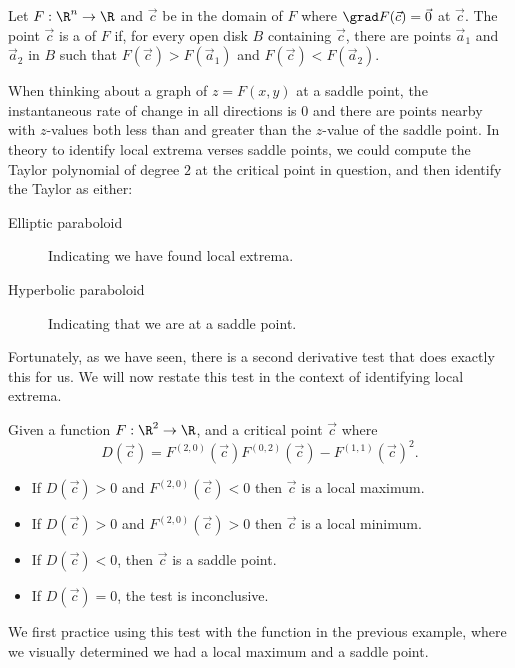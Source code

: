 \documentclass{ximera}
\begin{document}
\begin{definition}
  Let $F:\R^n\to\R$ and $\vec{c}$ be in the domain of $F$ where $\grad
  F(\vec{c})=\vec{0}$ at $\vec{c}$. The point $\vec{c}$ is a
   of $F$ if, for every open disk $B$ containing
  $\vec{c}$, there are points $\vec{a}_1$ and $\vec{a}_2$ in $B$ such
  that $F(\vec{c})>F(\vec{a}_1)$ and $F(\vec{c})<F(\vec{a}_2)$.
\end{definition}

When thinking about a graph of $z= F(x,y)$ at a saddle point, the
instantaneous rate of change in all directions is $0$ and there are
points nearby with $z$-values both less than and greater than the
$z$-value of the saddle point.  In theory to identify local extrema
verses saddle points, we could compute the Taylor polynomial of degree
$2$ at the critical point in question, and then identify the Taylor as
either:
\begin{description}
\item[Elliptic paraboloid] Indicating we have found local extrema.
\item[Hyperbolic paraboloid] Indicating that we are at a saddle point.
\end{description}
Fortunately, as we have seen, there is a second derivative test that
does exactly this for us. We will now restate this test in the context
of identifying local extrema.

\begin{theorem}
  Given a function $F:\R^2\to \R$, and a critical point $\vec{c}$ where
  \[
  D(\vec{c}) = F^{(2,0)}(\vec{c})F^{(0,2)}(\vec{c})-F^{(1,1)}(\vec{c})^2.
  \]
  \begin{itemize}
  \item If $D(\vec{c})>0$ and $F^{(2,0)}(\vec{c})<0$ then $\vec{c}$ is a local maximum.
  \item If $D(\vec{c})>0$ and $F^{(2,0)}(\vec{c})>0$ then $\vec{c}$ is a local minimum.
  \item	If $D(\vec{c})<0$, then $\vec{c}$ is a saddle point.
  \item If $D(\vec{c})=0$, the test is inconclusive.
  \end{itemize}
\end{theorem}

We first practice using this test with the function in the previous
example, where we visually determined we had a local maximum and a
saddle point.
\end{document}
